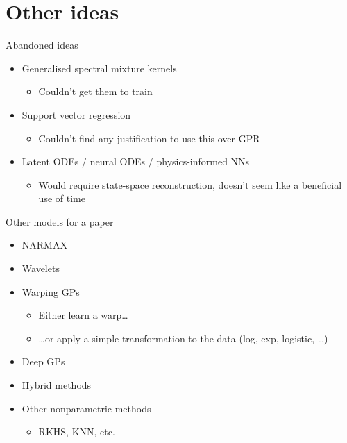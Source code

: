\documentclass[presentation]{beamer}
\begin{document}
\section{Other ideas}
\label{sec:orgc78cf39}
\begin{frame}[label={sec:org902d9e6}]{Abandoned ideas}
\begin{itemize}
\item Generalised spectral mixture kernels
\begin{itemize}
\item Couldn't get them to train
\end{itemize}
\end{itemize}

\vfill
\begin{itemize}
\item Support vector regression
\begin{itemize}
\item Couldn't find any justification to use this over GPR
\end{itemize}
\end{itemize}

\vfill
\begin{itemize}
\item Latent ODEs / neural ODEs / physics-informed NNs
\begin{itemize}
\item Would require state-space reconstruction, doesn't seem like a beneficial use of time
\end{itemize}
\end{itemize}
\end{frame}


\begin{frame}[label={sec:org6397256}]{Other models for a paper}
\begin{itemize}
\item NARMAX
\item Wavelets
\item Warping GPs
\begin{itemize}
\item Either learn a warp\ldots{}
\item \ldots{}or apply a simple transformation to the data (log, exp, logistic, \ldots{})
\end{itemize}
\item Deep GPs
\item Hybrid methods
\item Other nonparametric methods
\begin{itemize}
\item RKHS, KNN, etc.
\end{itemize}
\end{itemize}
\end{frame}
\end{document}
